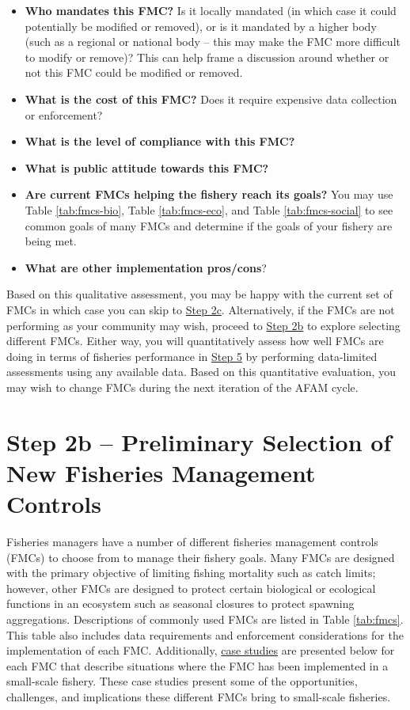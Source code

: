 \documentclass[]{book}
\begin{document}
\begin{itemize}
\item
  \textbf{Who mandates this FMC?} Is it locally mandated (in which case
  it could potentially be modified or removed), or is it mandated by a
  higher body (such as a regional or national body -- this may make the
  FMC more difficult to modify or remove)? This can help frame a
  discussion around whether or not this FMC could be modified or
  removed.
\item
  \textbf{What is the cost of this FMC?} Does it require expensive data
  collection or enforcement?
\item
  \textbf{What is the level of compliance with this FMC?}
\item
  \textbf{What is public attitude towards this FMC?}
\item
  \textbf{Are current FMCs helping the fishery reach its goals?} You may
  use Table \ref{tab:fmcs-bio}, Table \ref{tab:fmcs-eco}, and Table
  \ref{tab:fmcs-social} to see common goals of many FMCs and determine
  if the goals of your fishery are being met.
\item
  \textbf{What are other implementation pros/cons}?
\end{itemize}

Based on this qualitative assessment, you may be happy with the current
set of FMCs in which case you can skip to
\protect\hyperlink{Step2c}{Step 2c}. Alternatively, if the FMCs are not
performing as your community may wish, proceed to
\protect\hyperlink{Step2b}{Step 2b} to explore selecting different FMCs.
Either way, you will quantitatively assess how well FMCs are doing in
terms of fisheries performance in \protect\hyperlink{Step5}{Step 5} by
performing data-limited assessments using any available data. Based on
this quantitative evaluation, you may wish to change FMCs during the
next iteration of the AFAM cycle.

\hypertarget{Step2b}{\section{Step 2b -- Preliminary Selection of New
Fisheries Management Controls}\label{Step2b}}

Fisheries managers have a number of different fisheries management
controls (FMCs) to choose from to manage their fishery goals. Many FMCs
are designed with the primary objective of limiting fishing mortality
such as catch limits; however, other FMCs are designed to protect
certain biological or ecological functions in an ecosystem such as
seasonal closures to protect spawning aggregations. Descriptions of
commonly used FMCs are listed in Table \ref{tab:fmcs}. This table also
includes data requirements and enforcement considerations for the
implementation of each FMC. Additionally,
\protect\hyperlink{case-studies}{case studies} are presented below for
each FMC that describe situations where the FMC has been implemented in
a small-scale fishery. These case studies present some of the
opportunities, challenges, and implications these different FMCs bring
to small-scale fisheries.
\end{document}
